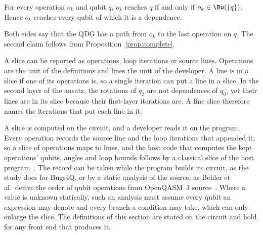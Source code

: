 \begin{proposition}\label{prop:dual}
For every operation $o_k$ and qubit $q$, $o_k$ reaches $q$ if and only if $o_k \in \Bw(\{q\})$. Hence $o_k$ reaches
every qubit of which it is a dependence.
\end{proposition}

\begin{IEEEproof}
Both sides say that the QDG has a path from $o_k$ to the last operation on $q$. The second claim follows from
Proposition~\ref{prop:complete}.
\end{IEEEproof}

A slice can be reported as operations, loop iterations or source lines. Operations are the unit of the definitions
and lines the unit of the developer. A line is in a slice if one of its operations is, so a single iteration can put a
line in a slice. In the second layer of the ansatz, the rotations of $q_2$ are not dependences of $q_0$, yet
their lines are in its slice because their first-layer iterations are. A line slice therefore names the iterations
that put each line in it.

A slice is computed on the circuit, and a developer reads it on the program. Every operation records the source
line and the loop iterations that appended it, so a slice of operations maps to lines, and the host code that
computes the kept operations' qubits, angles and loop bounds follows by a classical slice of the host
program~\cite{weiser1984program}. The record can be taken while the program builds its circuit, as the study does for
Bugs4Q, or by a static analysis of the source, as Behler et al.\ derive the order of qubit operations from OpenQASM~3 source~\cite{behler2025static}. Where a value is unknown statically, such an
analysis must assume every qubit an expression may denote and every branch a condition may take, which can only enlarge
the slice. The definitions of this section are stated on the circuit and hold for any front end that produces it.
